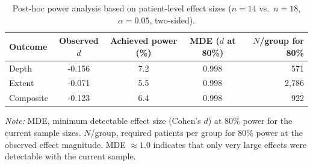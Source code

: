 \begin{table}[htbp]
\centering
\caption{Post-hoc power analysis based on patient-level effect sizes ($n = 14$ vs.\ $n = 18$, $\alpha = 0.05$, two-sided).}
\label{tab:power}
\begin{tabular}{l S[table-format=-1.3] S[table-format=1.1] S[table-format=1.3] r}
\toprule
{Outcome} & {Observed $d$} & {Achieved power (\%)} & {MDE ($d$ at 80\%)} & {$N$/group for 80\%} \\
\midrule
Depth     & -0.156 & 7.2 & 0.998 & 571 \\
Extent    & -0.071 & 5.5 & 0.998 & 2{,}786 \\
Composite & -0.123 & 6.4 & 0.998 & 922 \\
\bottomrule
\end{tabular}
\smallskip

\noindent\textit{Note:} MDE, minimum detectable effect size (Cohen's $d$) at 80\% power for the current sample sizes. $N$/group, required patients per group for 80\% power at the observed effect magnitude. MDE $\approx 1.0$ indicates that only very large effects were detectable with the current sample.
\end{table}
